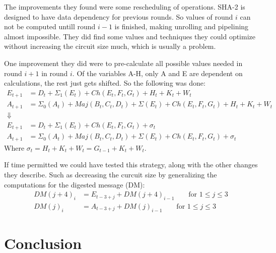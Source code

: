 \documentclass[a4paper, openany]{book}
\begin{document}
\begin{abstact}
The improvements they found were some rescheduling of operations. SHA-2 is designed to have data dependency for previous rounds.
So values of round \(i\) can not be computed untill round \(i-1\) is finished, making unrolling and pipelining almost impossible.
They did find some values and techniques they could optimize without increasing the circuit size much, which is usually a problem.

One improvement they did were to pre-calculate all possible values needed in round \(i+1\) in round \(i\).
Of the variables A-H, only A and E are dependent on calculations, the rest just gets shifted. So the following was done:
\begin{align}
E_{t+1} &= D_t+\Sigma_1(E_t)+Ch(E_t,F_t,G_t)+H_t+K_t+W_t\\
A_{t+1} &= \Sigma_0(A_t)+Maj(B_t,C_t,D_t)+\Sigma(E_t)+Ch(E_t,F_t,G_t)+H_t+K_t+W_t\\
\Downarrow\\
E_{t+1} &= D_t+\Sigma_1(E_t)+Ch(E_t,F_t,G_t)+\sigma_t\\
A_{t+1} &= \Sigma_0(A_t)+Maj(B_t,C_t,D_t)+\Sigma(E_t)+Ch(E_t,F_t,G_t)+\sigma_t
\end{align}
Where \(\sigma_t = H_t + K_t + W_t = G_{t-1} + K_t + W_t\).

If time permitted we could have tested this strategy, along with the other changes they describe. Such as decreasing the curcuit size by generalizing the computations for the digested message (DM):
\begin{align}
DM(j+4)_i &= E_{t-3+j} + DM(j+4)_{i-1}\qquad \text{for } 1\leq j \leq 3\\
DM(j)_i &= A_{t-3+j} + DM(j)_{i-1}\qquad \text{for } 1\leq j \leq 3
\end{align}

\chapter{Conclusion}
\label{sec:orgdb880e5}




\begin{appendix}

\end{appendix}
\end{abstact}
\end{document}

